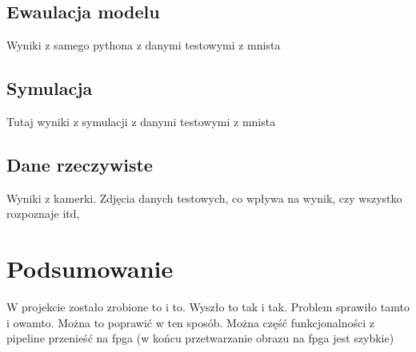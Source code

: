 \documentclass[12pt, oneside]{article}
\begin{document}
\subsection{Ewaulacja modelu}
Wyniki z samego pythona z danymi testowymi z mnista

\subsection{Symulacja}
Tutaj wyniki z symulacji z danymi testowymi z mnista

\subsection{Dane rzeczywiste}
Wyniki z kamerki. Zdjęcia danych testowych, co wpływa na wynik, czy wszystko
rozpoznaje itd,

\newpage
\section{Podsumowanie}
W projekcie zostało zrobione to i to. Wyszło to tak i tak. Problem sprawiło
tamto i owamto. Można to poprawić w ten sposób. Można część funkcjonalności
z pipeline przenieść na fpga (w końcu przetwarzanie obrazu na fpga jest szybkie)
\end{document}
